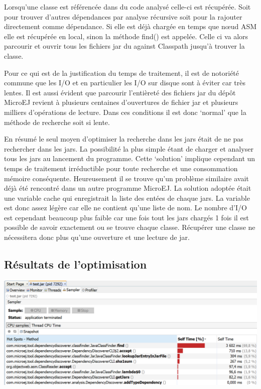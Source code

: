 \documentclass[french,a4paper,12pt]{report}
\begin{document}
Lorsqu’une classe est référencée dans du code analysé celle-ci est récupérée. Soit pour trouver d’autres dépendances par analyse récursive soit pour la rajouter directement comme dépendance. Si elle est déjà chargée en temps que nœud ASM elle est récupérée en local, sinon la méthode find() est appelée. Celle ci va alors parcourir et ouvrir tous les fichiers jar du against Classpath jusqu’à trouver la classe.

Pour ce qui est de la justification du temps de traitement, il est de notoriété commune que les I/O et en particulier les I/O sur disque sont à éviter car très lentes. Il est aussi évident que parcourir l’entièreté des fichiers jar du dépôt MicroEJ revient à plusieurs centaines d’ouvertures de fichier jar et plusieurs milliers d’opérations de lecture. Dans ces conditions il est donc ‘normal’ que la méthode de recherche soit si lente.

En résumé le seul moyen d’optimiser la recherche dans les jars était de ne pas rechercher dans les jars. La possibilité la plus simple étant de charger et analyser tous les jars au lancement du programme. Cette ‘solution’ implique cependant un temps de traitement irréductible pour toute recherche et une consommation mémoire conséquente. Heureusement il se trouve qu’un problème similaire avait déjà été rencontré dans un autre programme MicroEJ. La solution adoptée était une variable cache qui enregistrait la liste des entées de chaque jars. La variable est donc assez légère car elle ne contient qu’une liste de nom. Le nombre d’I/O est cependant beaucoup plus faible car une fois tout les jars chargés 1 fois il est possible de savoir exactement ou se trouve chaque classe. Récupérer une classe ne nécessitera donc plus qu’une ouverture et une lecture de jar.

\subsection{Résultats de l’optimisation}

\begin{center}
\includegraphics[width=\textwidth]{./ressources/images/timeRepartitionByMethodsCachedsheer.png}
\end{center}
\end{document}
